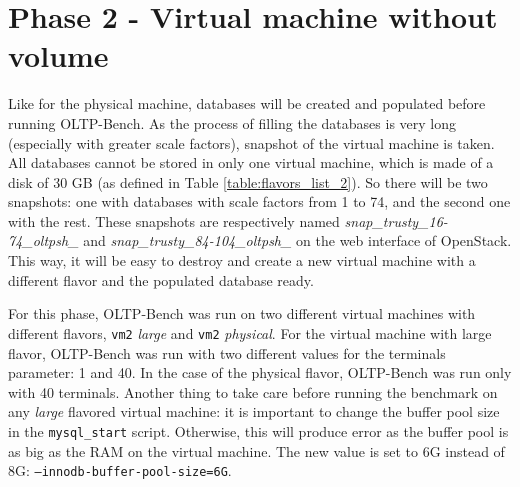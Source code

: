\section{Phase 2 - Virtual machine without volume}
\label{section:phase2}

Like for the physical machine, databases will be created and populated before running OLTP-Bench. 
As the process of filling the databases is very long (especially with greater scale factors), snapshot of the virtual machine is taken.
All databases cannot be stored in only one virtual machine, which is made of a disk of 30 GB (as defined in Table \ref{table:flavors_list_2}).
So there will be two snapshots: one with databases with scale factors from 1 to 74, and the second one with the rest.
These snapshots are respectively named \textit{snap\_trusty\_16-74\_oltpsh\_} and \textit{snap\_trusty\_84-104\_oltpsh\_} on the web interface of OpenStack.
This way, it will be easy to destroy and create a new virtual machine with a different flavor and the populated database ready.

For this phase, OLTP-Bench was run on two different virtual machines with different flavors, \texttt{vm2} \textit{large} and \texttt{vm2} \textit{physical}. 
For the virtual machine with large flavor, OLTP-Bench was run with two different values for the terminals parameter: 1 and 40.
In the case of the physical flavor, OLTP-Bench was run only with 40 terminals.
Another thing to take care before running the benchmark on any \textit{large} flavored virtual machine: it is important to change the buffer pool size in the \texttt{mysql\_start} script. 
Otherwise, this will produce error as the buffer pool is as big as the RAM on the virtual machine.
The new value is set to 6G instead of 8G: \texttt{--innodb-buffer-pool-size=6G}.

